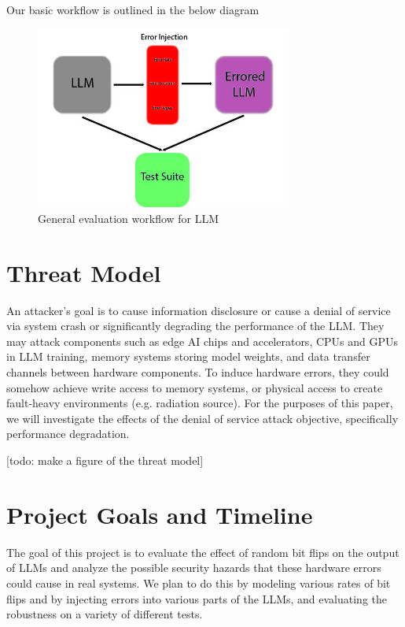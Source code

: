 \documentclass[a4paper]{article}
\begin{document}
Our basic workflow is outlined in the below diagram

\begin{figure}[ht]
	\begin{center}
		\includegraphics[height=6cm]{workflow.jpg}
		\caption{General evaluation workflow for LLM}
		\label{workflow}
	\end{center}
\end{figure}

\section{Threat Model}
An attacker's goal is to cause information disclosure or cause a denial of service via system crash or significantly degrading the performance of the LLM. They may attack components such as edge AI chips and accelerators, CPUs and GPUs in LLM training, memory systems storing model weights, and data transfer channels between hardware components. To induce hardware errors, they could somehow achieve write access to memory systems, or physical access to create fault-heavy environments (e.g. radiation source). For the purposes of this paper, we will investigate the effects of the denial of service attack objective, specifically performance degradation.


[todo: make a figure of the threat model]

\section{Project Goals and Timeline}

The goal of this project is to evaluate the effect of random bit flips on the output of LLMs and analyze the possible security hazards that these hardware errors could cause in real systems. We plan to do this by modeling various rates of bit flips and by injecting errors into various parts of the LLMs, and evaluating the robustness on a variety of different tests.
\end{document}
